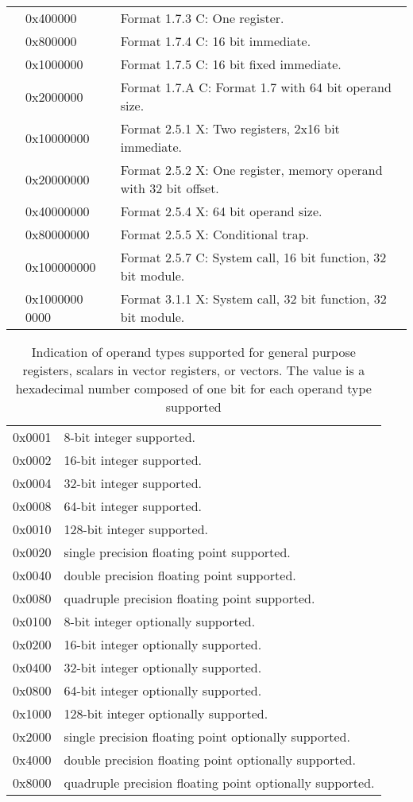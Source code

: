 \documentclass[forwardcom.tex]{subfiles}
\begin{document}
\begin{longtable} {|p{18mm}|p{20mm} p{80mm}|}
  &  0x400000 & Format 1.7.3 C: One register. \\
  &  0x800000 & Format 1.7.4 C: 16 bit immediate. \\
  &  0x1000000 & Format 1.7.5 C: 16 bit fixed immediate. \\
  &  0x2000000 & Format 1.7.A C: Format 1.7 with 64 bit operand size. \\
  &  0x10000000 & Format 2.5.1 X: Two registers, 2x16 bit immediate. \\
  &  0x20000000 & Format 2.5.2 X: One register, memory operand with 32 bit offset. \\
  &  0x40000000 & Format 2.5.4 X: 64 bit operand size. \\  
  &  0x80000000 & Format 2.5.5 X: Conditional trap. \\
  &  0x100000000 & Format 2.5.7 C: System call, 16 bit function, 32 bit module. \\
  & 0x1000000 0000 & Format 3.1.1 X: System call, 32 bit function, 32 bit module. \\
\hline
\end{longtable}

\begin{longtable} {|p{18mm}|p{100mm}|}
\caption{
Indication of operand types supported for general purpose registers, scalars in vector
registers, or vectors. The value is a hexadecimal number composed of one bit for each operand
type supported} 
\label{table:OperandTypesInInstructionList} \\
\endfirsthead
\endhead
\hline
0x0001 & 8-bit integer supported. \\
0x0002 & 16-bit integer supported. \\
0x0004 & 32-bit integer supported. \\
0x0008 & 64-bit integer supported. \\
0x0010 & 128-bit integer supported. \\
0x0020 & single precision floating point supported. \\
0x0040 & double precision floating point supported. \\
0x0080 & quadruple precision floating point supported. \\
0x0100 & 8-bit integer optionally supported. \\
0x0200 & 16-bit integer optionally supported. \\
0x0400 & 32-bit integer optionally supported. \\
0x0800 & 64-bit integer optionally supported. \\
0x1000 & 128-bit integer optionally supported. \\
0x2000 & single precision floating point optionally supported. \\
0x4000 & double precision floating point optionally supported. \\
0x8000 & quadruple precision floating point optionally supported. \\
\hline
\end{longtable}
\end{document}
